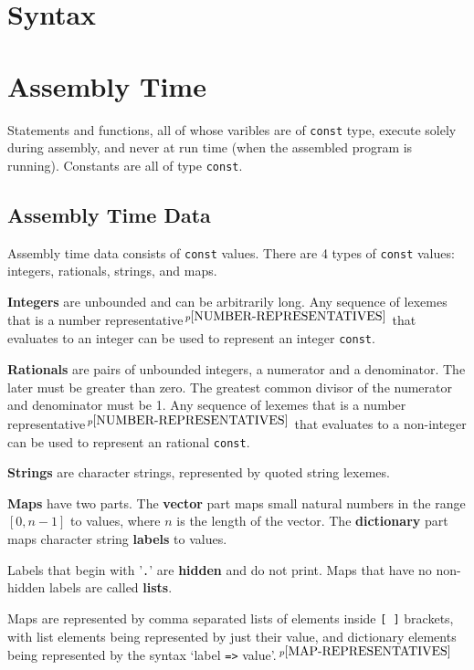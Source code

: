 \documentclass[12pt]{article}
\newcommand{\key}[1]{{\rm \bfseries #1}}
\newcommand{\pagnote}[1]{$\,^{p\pageref{#1}}$}
\begin{document}
\section{Syntax}


\section{Assembly Time}

Statements and functions, all of whose varibles are of {\tt const}
type, execute solely during assembly, and never at run time
(when the assembled program is running).  Constants are all of
type {\tt const}.

\subsection{Assembly Time Data}

Assembly time data consists of {\tt const} values.
There are 4 types of {\tt const} values: integers, rationals, strings,
and maps.

\key{Integers} are unbounded and can be arbitrarily long.
Any sequence of lexemes that is a
number representative\pagnote{NUMBER-REPRESENTATIVES}
that evaluates to an integer
can be used to represent an integer {\tt const}.

\key{Rationals} are pairs of unbounded integers, a numerator and a denominator.
The later must be greater than zero.  The greatest common divisor
of the numerator and denominator must be 1.
Any sequence of lexemes that is a
number representative\pagnote{NUMBER-REPRESENTATIVES}
that evaluates to a non-integer
can be used to represent an rational {\tt const}.

\key{Strings} are character strings, represented by quoted string lexemes.

\key{Maps} have two parts.  The \key{vector} part maps small
natural numbers in the range $[0,n-1]$ to values, where $n$
is the length of the vector.  The \key{dictionary} part maps
character string \key{labels} to values.

Labels that begin with '{\tt .}' are \key{hidden} and do not
print.  Maps that have no non-hidden labels are called \key{lists}.

Maps are represented by comma separated lists of elements inside
{\tt [~]} brackets, with list elements being represented by
just their value, and dictionary elements being represented
by the syntax `label {\tt =>} value'.\pagnote{MAP-REPRESENTATIVES}
\end{document}
